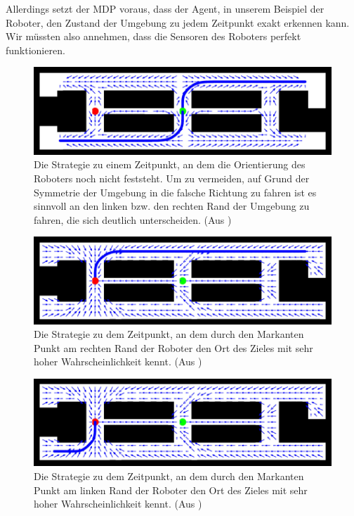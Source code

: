 \documentclass[a4paper]{IEEEtran}
\begin{document}
Allerdings setzt der MDP voraus, dass der Agent, in unserem Beispiel der Roboter, den Zustand der Umgebung zu jedem Zeitpunkt exakt erkennen kann. Wir müssten also annehmen, dass die Sensoren des Roboters perfekt funktionieren.

\begin{figure}[ht]
	\centering
	\includegraphics[scale=0.72]{images/autnmRobot_POMDPPathA.png}
	\caption{Die Strategie zu einem Zeitpunkt, an dem die Orientierung des Roboters noch nicht feststeht. Um zu vermeiden, auf Grund der Symmetrie der Umgebung in die falsche Richtung zu fahren ist es sinnvoll an den linken bzw. den rechten Rand der Umgebung zu fahren, die sich deutlich unterscheiden. (Aus \cite{thrun2005probabilistic})}
	\label{autnmRobot_POMDPPathA}
\end{figure}

\begin{figure}[ht]
	\centering
	\includegraphics[scale=0.72]{images/autnmRobot_POMDPPathB.png}
	\caption{Die Strategie zu dem Zeitpunkt, an dem durch den Markanten Punkt am rechten Rand der Roboter den Ort des Zieles mit sehr hoher Wahrscheinlichkeit kennt. (Aus \cite{thrun2005probabilistic})}
	\label{autnmRobot_POMDPPathB}
\end{figure}

\begin{figure}[ht]
	\centering
	\includegraphics[scale=0.72]{images/autnmRobot_POMDPPathC.png}
	\caption{Die Strategie zu dem Zeitpunkt, an dem durch den Markanten Punkt am linken Rand der Roboter den Ort des Zieles mit sehr hoher Wahrscheinlichkeit kennt. (Aus \cite{thrun2005probabilistic})}
	\label{autnmRobot_POMDPPathC}
\end{figure}
\end{document}
